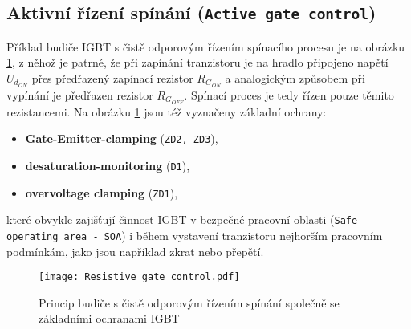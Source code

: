      \subsection{Aktivní řízení spínání (\texttt{Active gate con\-trol})}
       Příklad budiče IGBT s čistě odporovým řízením spínacího procesu je na obrázku 
       \ref{VE:fig_res_gate_drv}, z něhož je patrné, že při zapínání tranzistoru je na hradlo 
       připojeno napětí $U_{d_{ON}}$ přes předřazený zapínací rezistor $R_{G_{ON}}$ a analogickým 
       způsobem při vypínání je předřazen rezistor $R_{G_{OFF}}$. Spínací proces je tedy řízen 
       pouze těmito rezistancemi. Na obrázku \ref{VE:fig_res_gate_drv} jsou též vyznačeny základní 
       ochrany:
       \begin{itemize}
         \item \textbf{Gate-Emitter-clamping} (\texttt{ZD2, ZD3}),
         \item \textbf{desaturation-monitoring} (\texttt{D1}),
         \item \textbf{overvoltage clamping} (\texttt{ZD1}),
       \end{itemize}
      které obvykle zajišťují činnost IGBT v bezpečné pracovní oblasti (\texttt{Safe operating area 
      - SOA}) i během vystavení tranzistoru nejhorším pracovním podmínkám, jako jsou například 
      zkrat nebo přepětí.

      \begin{figure}[ht!]
        \centering
        \texttt{[image: Resistive\_gate\_control.pdf]}
        \caption{Princip budiče s čistě odporovým řízením spínání společně se
                základními ochranami IGBT}\label{VE:fig_res_gate_drv}
      \end{figure}


